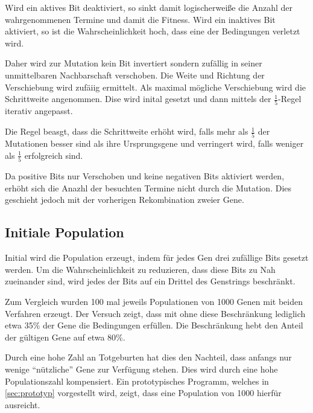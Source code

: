 Wird ein aktives Bit deaktiviert, so sinkt damit logischerweiße die Anzahl der wahrgenommenen Termine und damit die Fitness.
Wird ein inaktives Bit aktiviert, so ist die Wahrscheinlichkeit hoch, dass eine der Bedingungen verletzt wird.

Daher wird zur Mutation kein Bit invertiert sondern zufällig in seiner unmittelbaren Nachbarschaft verschoben.
Die Weite und Richtung der Verschiebung wird zufäiig ermittelt. Als maximal mögliche Verschiebung wird die Schrittweite angenommen.
Dise wird inital gesetzt und dann mittels der $\frac{1}{5}$-Regel iterativ angepasst.

Die Regel beasgt, dass die Schrittweite erhöht wird, falls mehr als $\frac{1}{5}$ der Mutationen besser sind als ihre Ursprungsgene
und verringert wird, falls weniger als $\frac{1}{5}$ erfolgreich sind.

Da positive Bits nur Verschoben und keine negativen Bits aktiviert werden,
erhöht sich die Anazhl der besuchten Termine nicht durch die Mutation.
Dies geschieht jedoch mit der vorherigen Rekombination zweier Gene.

\subsection{Initiale Population}
Initial wird die Population erzeugt,
indem für jedes Gen drei zufällige Bits gesetzt werden.
Um die Wahrscheinlichkeit zu reduzieren, dass diese Bits zu Nah zueinander sind,
wird jedes der Bits auf ein Drittel des Genstrings beschränkt.

Zum Vergleich wurden 100 mal jeweils Populationen von 1000 Genen mit beiden Verfahren erzeugt.
Der Versuch zeigt, dass mit ohne diese Beschränkung lediglich etwa 35\% der Gene die Bedingungen erfüllen.
Die Beschränkung hebt den Anteil der gültigen Gene auf etwa 80\%.

Durch eine hohe Zahl an Totgeburten hat dies den Nachteil,
dass anfangs nur wenige \enquote{nützliche} Gene zur Verfügung stehen.
Dies wird durch eine hohe Populationszahl kompensiert.
Ein prototypisches Programm, welches in \autoref{sec:prototyp} vorgestellt wird,
zeigt, dass eine Population von 1000 hierfür ausreicht.

